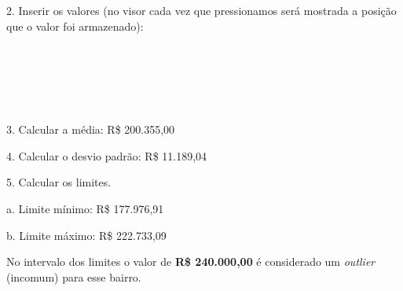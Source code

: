 2. Inserir os valores (no visor cada vez que pressionamos \keystroke{$\sum+$} será mostrada a posição que o valor foi armazenado): \\
      \keystroke{$\sum+$} \ \ \ \ 
      \keystroke{$\sum+$} \\
  \keystroke{$5$}    \keystroke{$\sum+$} \ \ \ \ 
 \keystroke{$2$}     \keystroke{$\sum+$} \\
  \keystroke{$6$} \keystroke{$7$}   \keystroke{$\sum+$} \ \ \ \ 
\keystroke{$2$} \keystroke{$0$}     \keystroke{$\sum+$} \\
\keystroke{$2$} \keystroke{$0$} \keystroke{$0$} \keystroke{$0$} \keystroke{$0$} \keystroke{$0$} \keystroke{$\sum+$} \ \ \ \ 
      \keystroke{$\sum+$} \\
\keystroke{$1$} \keystroke{$9$}  \keystroke{$1$}   \keystroke{$\sum+$} \ \ \ \ 
\keystroke{$2$} \keystroke{$0$} \keystroke{$0$}    \keystroke{$\sum+$}

3. Calcular a média: R\$ 200.355,00 \\
 \keystroke{$\bar{x}$}

4. Calcular o desvio padrão: R\$ 11.189,04 \\ 
 

5. Calcular os limites.

a. Limite mínimo: R\$ 177.976,91 \\
\keystroke{$g$}      \keystroke{$\times$}   \keystroke{$-$}

b. Limite máximo: R\$ 222.733,09 \\
   \keystroke{$+$}

No intervalo dos limites o valor de \textbf{R\$ 240.000,00} é considerado um \textit{outlier} (incomum) para esse bairro.

